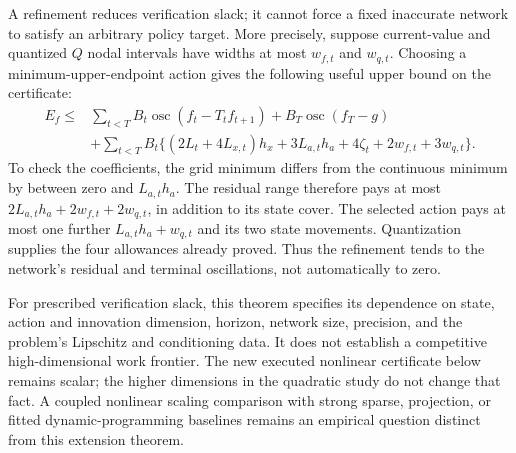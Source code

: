 \documentclass[ecta,nameyear,draft]{econsocart}
\theoremstyle{definition}
\theoremstyle{remark}
\begin{document}
A refinement reduces verification slack; it cannot force a fixed inaccurate
network to satisfy an arbitrary policy target. More precisely, suppose
current-value and quantized $Q$ nodal intervals have widths at most
$w_{f,t}$ and $w_{q,t}$. Choosing a minimum-upper-endpoint action gives the
following useful upper bound on the certificate:
\begin{align*}
 E_f\leq &\sum_{t<T}B_t\operatorname{osc}(f_t-T_tf_{t+1})
       +B_T\operatorname{osc}(f_T-g)\\
 &+\sum_{t<T}B_t\{(2L_t+4L_{x,t})h_x+3L_{a,t}h_a
              +4\zeta_t+2w_{f,t}+3w_{q,t}\}.
\end{align*}
To check the coefficients, the grid minimum differs from the continuous
minimum by between zero and $L_{a,t}h_a$. The residual range therefore
pays at most $2L_{a,t}h_a+2w_{f,t}+2w_{q,t}$, in addition to its state
cover. The selected action pays at most one further $L_{a,t}h_a+w_{q,t}$
and its two state movements. Quantization supplies the four allowances
already proved. Thus the refinement tends to the network's residual and
terminal oscillations, not automatically to zero.

For prescribed verification slack, this theorem specifies its dependence
on state, action and innovation dimension, horizon, network size, precision,
and the problem's Lipschitz and conditioning data. It does not establish a
competitive high-dimensional work frontier. The new executed nonlinear
certificate below remains scalar; the higher dimensions in the quadratic
study do not change that fact. A coupled nonlinear scaling comparison with
strong sparse, projection, or fitted dynamic-programming baselines remains
an empirical question distinct from this extension theorem.
\end{document}
